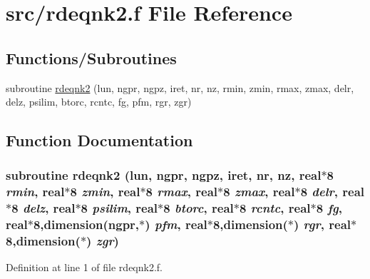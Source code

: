 \hypertarget{rdeqnk2_8f}{
\section{src/rdeqnk2.f File Reference}
\label{rdeqnk2_8f}
}
\subsection*{Functions/Subroutines}
\begin{CompactItemize}
\item 
subroutine \hyperlink{rdeqnk2_8f_fb7c7f97b0a07d635c40a7459d62767b}{rdeqnk2} (lun, ngpr, ngpz, iret, nr, nz, rmin, zmin, rmax, zmax, delr, delz, psilim, btorc, rcntc, fg, pfm, rgr, zgr)
\end{CompactItemize}


\subsection{Function Documentation}
\hypertarget{rdeqnk2_8f_fb7c7f97b0a07d635c40a7459d62767b}{
\subsubsection[rdeqnk2]{\setlength{\rightskip}{0pt plus 5cm}subroutine rdeqnk2 (lun, \/  ngpr, \/  ngpz, \/  iret, \/  nr, \/  nz, \/  real$\ast$8 {\em rmin}, \/  real$\ast$8 {\em zmin}, \/  real$\ast$8 {\em rmax}, \/  real$\ast$8 {\em zmax}, \/  real$\ast$8 {\em delr}, \/  real$\ast$8 {\em delz}, \/  real$\ast$8 {\em psilim}, \/  real$\ast$8 {\em btorc}, \/  real$\ast$8 {\em rcntc}, \/  real$\ast$8 {\em fg}, \/  real$\ast$8,dimension(ngpr,$\ast$) {\em pfm}, \/  real$\ast$8,dimension($\ast$) {\em rgr}, \/  real$\ast$8,dimension($\ast$) {\em zgr})}}
\label{rdeqnk2_8f_fb7c7f97b0a07d635c40a7459d62767b}




Definition at line 1 of file rdeqnk2.f.
